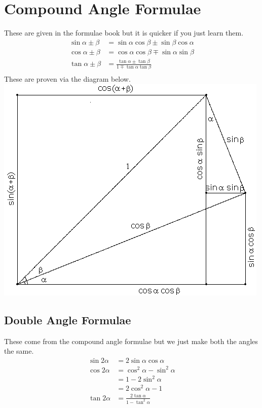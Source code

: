 \documentclass[a4paper,12pt]{article}
\begin{document}
\section*{Compound Angle Formulae}
These are given in the formulae book but it is quicker if you just learn them. 
\begin{align*}
\sin \alpha \pm \beta & = \sin \alpha \cos \beta \pm \sin \beta \cos \alpha \\
\cos \alpha \pm \beta & = \cos \alpha \cos \beta \mp \sin \alpha \sin \beta \\
\tan \alpha \pm \beta & = \frac{\tan \alpha \pm \tan \beta}{1 \mp \tan \alpha \tan \beta} \\
\end{align*}
These are proven via the diagram below. \\
\includegraphics[scale=0.3]{CompoundAngle} \\
\subsection*{Double Angle Formulae}
These come from the compound angle formulae but we just make both the angles the same. 
\begin{align*}
\sin 2 \alpha & = 2 \sin \alpha \cos \alpha \\ 
\cos 2 \alpha & = \cos^2 \alpha - \sin^2 \alpha \\
& = 1 - 2 \sin^2 \alpha \\
& = 2 \cos^2 \alpha - 1 \\ 
\tan 2 \alpha & = \frac{2 \tan \alpha}{1 - \tan^2 \alpha}
\end{align*}
\end{document}
